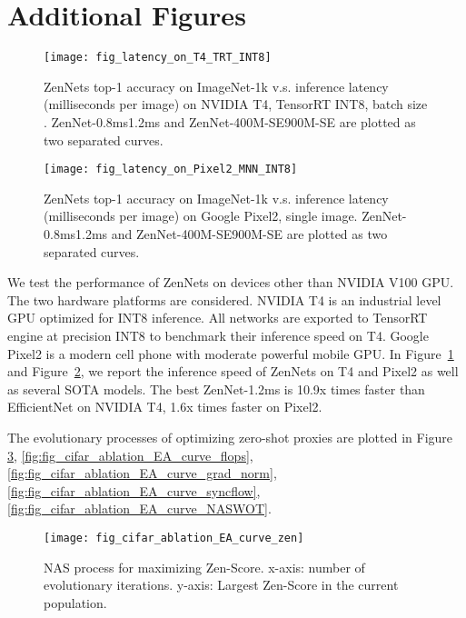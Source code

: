 \documentclass{article}
\begin{document}
\section{Additional Figures}
\label{sec:additional-figures}


\begin{figure}[!h]
 \centering
 \texttt{[image: fig\_latency\_on\_T4\_TRT\_INT8]}
 \caption{ZenNets top-1 accuracy on ImageNet-1k v.s. inference latency (milliseconds per image) on NVIDIA T4, TensorRT INT8, batch size . ZenNet-0.8ms1.2ms and ZenNet-400M-SE900M-SE are plotted as two separated curves.} \label{fig:fig_plot_latency_on_T4_TRT_INT8}
\end{figure}

\begin{figure}[!h]
 \centering
 \texttt{[image: fig\_latency\_on\_Pixel2\_MNN\_INT8]}
 \caption{ZenNets top-1 accuracy on ImageNet-1k v.s. inference latency (milliseconds per image) on Google Pixel2, single image. ZenNet-0.8ms1.2ms and ZenNet-400M-SE900M-SE are plotted as two separated curves.} \label{fig:fig_plot_latency_on_Pixel2_MNN_INT8}
\end{figure}

We test the performance of ZenNets on devices other than NVIDIA V100 GPU. The two hardware platforms are considered. NVIDIA T4 is an industrial level GPU optimized for INT8 inference. All networks are exported to TensorRT engine at precision INT8 to benchmark their inference speed on T4. Google Pixel2 is a modern cell phone with moderate powerful mobile GPU. In Figure~\ref{fig:fig_plot_latency_on_T4_TRT_INT8} and Figure~\ref{fig:fig_plot_latency_on_Pixel2_MNN_INT8}, we report the inference speed of ZenNets on T4 and Pixel2 as well as several SOTA models. The best ZenNet-1.2ms is 10.9x times faster than EfficientNet on NVIDIA T4, 1.6x times faster on Pixel2. 

The evolutionary processes of optimizing zero-shot proxies are plotted in Figure \ref{fig:fig_cifar_ablation_EA_curve_zen}, \ref{fig:fig_cifar_ablation_EA_curve_flops}, \ref{fig:fig_cifar_ablation_EA_curve_grad_norm}, \ref{fig:fig_cifar_ablation_EA_curve_syncflow}, \ref{fig:fig_cifar_ablation_EA_curve_NASWOT}.


 \begin{figure}[!h]
   \begin{center}
     \texttt{[image: fig\_cifar\_ablation\_EA\_curve\_zen]}
   \end{center}
 \caption{NAS process for maximizing Zen-Score. x-axis: number of evolutionary iterations. y-axis: Largest Zen-Score in the current population.}
 \label{fig:fig_cifar_ablation_EA_curve_zen}
\end{figure}
\end{document}
